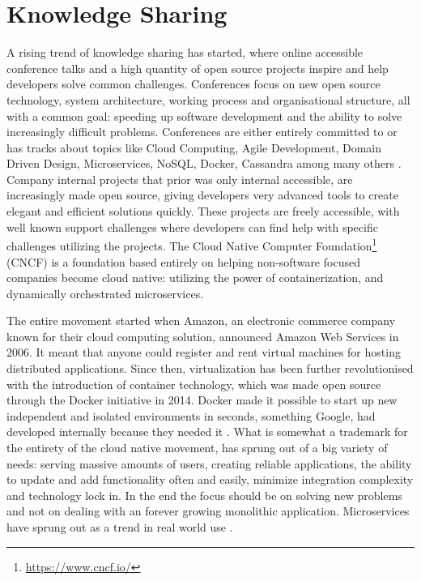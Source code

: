 \section{Knowledge Sharing}
A rising trend of knowledge sharing has started, where online accessible conference talks and a high quantity of open source projects inspire and help developers solve common challenges. Conferences focus on new open source technology, system architecture, working process and organisational structure, all with a common goal: speeding up software development and the ability to solve increasingly difficult problems. Conferences are either entirely committed to or has tracks about topics like Cloud Computing, Agile Development, Domain Driven Design, Microservices, NoSQL, Docker, Cassandra among many others \cite{george2016it}. Company internal projects that prior was only internal accessible, are increasingly made open source, giving developers very advanced tools to create elegant and efficient solutions quickly. These projects are freely accessible, with well known support challenges where developers can find help with specific challenges utilizing the projects. The Cloud Native Computer Foundation\footnote{\url{https://www.cncf.io/}} (CNCF) is a foundation based entirely on helping non-software focused companies become cloud native: utilizing the power of containerization, and dynamically orchestrated microservices.

The entire movement started when Amazon, an electronic commerce company known for their cloud computing solution, announced Amazon Web Services in 2006. It meant that anyone could register and rent virtual machines for hosting distributed applications. Since then, virtualization has been further revolutionised with the introduction of container technology, which was made open source through the Docker initiative in 2014. Docker made it possible to start up new independent and isolated environments in seconds, something Google, had developed internally because they needed it \cite{bernstein2014containers}. What is somewhat a trademark for the entirety of the cloud native movement, has sprung out of a big variety of needs: serving massive amounts of users, creating reliable applications, the ability to update and add functionality often and easily, minimize integration complexity and technology lock in. In the end the focus should be on solving new problems and not on dealing with an forever growing monolithic application. Microservices have sprung out as a trend in real world use \cite[p.~1]{newman2015microservices}.

